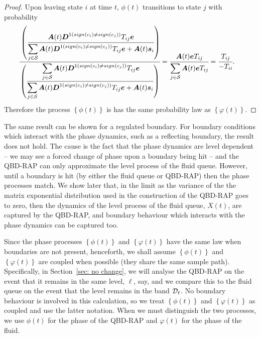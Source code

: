 \begin{proof}
	Upon leaving state \(i\) at time \(t\), \({\phi}(t)\) transitions to state \(j\) with probability 
	\begin{align*}
            	\cfrac{\left(\cfrac{\boldsymbol A(t) \boldsymbol{D}^{1(sign(c_i)\neq sign(c_j))}T_{ij}\boldsymbol e}{\displaystyle\sum_{j\in\mathcal S}\boldsymbol A(t) \boldsymbol{D}^{1(sign(c_i)\neq sign(c_j))}T_{ij}\boldsymbol e + \boldsymbol A(t) \boldsymbol s_i}\right)}
            	{\left(\cfrac{\displaystyle\sum_{j\in\mathcal S}\boldsymbol A(t) \boldsymbol{D}^{1(sign(c_i)\neq sign(c_j))}T_{ij}\boldsymbol e}{\displaystyle\sum_{j\in\mathcal S}\boldsymbol A(t) \boldsymbol{D}^{1(sign(c_i)\neq sign(c_j))}T_{ij}\boldsymbol e + \boldsymbol A(t) \boldsymbol s_i}\right)}
            	&=\cfrac{\boldsymbol A(t) \boldsymbol eT_{ij}}
            	{\displaystyle\sum_{j\in\mathcal S}\boldsymbol A(t) \boldsymbol eT_{ij}}
	= \cfrac{T_{ij}}
            	{-T_{ii}}.
	 \end{align*}
	 Therefore the process \(\left\{{\phi}(t)\right\}\) is has the same probability law as \(\left\{\varphi(t)\right\}\).
\end{proof}
\begin{rem}
The same result can be shown for a regulated boundary. For boundary conditions which interact with the phase dynamics, such as a reflecting boundary, the result does not hold. The cause is the fact that the phase dynamics are level dependent -- we may see a forced change of phase upon a boundary being hit -- and the QBD-RAP can only approximate the level process of the fluid queue. However, until a boundary is hit (by either the fluid queue or QBD-RAP) then the phase processes match. We show later that, in the limit as the variance of the the matrix exponential distribution used in the construction of the QBD-RAP goes to zero, then the dynamics of the level process of the fluid queue, \(X(t)\), are captured by the QBD-RAP, and boundary behaviour which interacts with the phase dynamics can be captured too.
\end{rem}

Since the phase processes \(\left\{{\phi}(t)\right\}\) and \(\left\{\varphi(t)\right\}\) have the same law when boundaries are not present, henceforth, we shall assume \(\left\{{\phi}(t)\right\}\) and \(\left\{\varphi(t)\right\}\) are coupled when possible (they share the same sample path). Specifically, in Section~\ref{sec: no change}, we will analyse the QBD-RAP on the event that it remains in the same level, \(\ell\), say, and we compare this to the fluid queue on the event that the level remains in the band \(\mathcal{D}_\ell\). No boundary behaviour is involved in this calculation, so we treat \(\left\{{\phi}(t)\right\}\) and \(\left\{\varphi(t)\right\}\) as coupled and use the latter notation. When we must distinguish the two processes, we use \(\phi(t)\) for the phase of the QBD-RAP and \(\varphi(t)\) for the phase of the fluid. 


